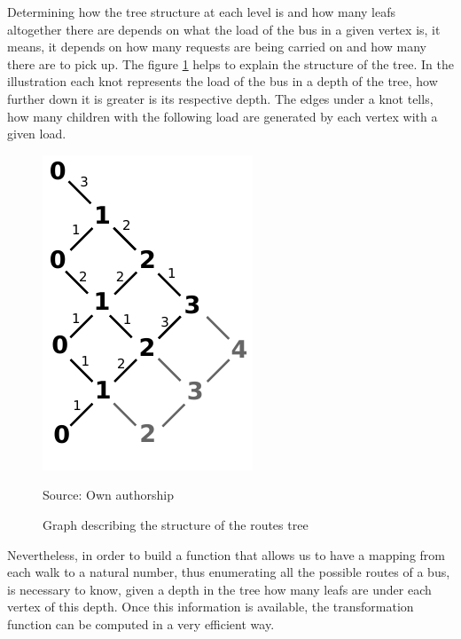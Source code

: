 \documentclass[tuberlin,cic,tc,openright,english,noabntcite,oneside]{iiufrgs}
\begin{document}
Determining how the tree structure at each level is and how many leafs altogether there are depends on what the load of the bus in a given vertex is, it means, it depends on how many requests are being carried on and how many there are to pick up. The figure \ref{fig:load_bus_scheme} helps to explain the structure of the tree. In the illustration each knot represents the load of the bus in a depth of the tree, how further down it is greater is its respective depth. The edges under a knot tells, how many children with the following load are generated by each vertex with a given load.
\begin{figure}[H]
    \caption{Graph describing the structure of the routes tree}
    \begin{center}
        \includegraphics{fig_load_bus_scheme}
    \end{center}
	\center Source: Own authorship
    \label{fig:load_bus_scheme}
\end{figure}

Nevertheless, in order to build a function that allows us to have a mapping from each walk to a natural number, thus enumerating all the possible routes of a bus, is necessary to know, given a depth in the tree how many leafs are under each vertex of this depth. Once this information is available, the transformation function can be computed in a very efficient way.
\end{document}
